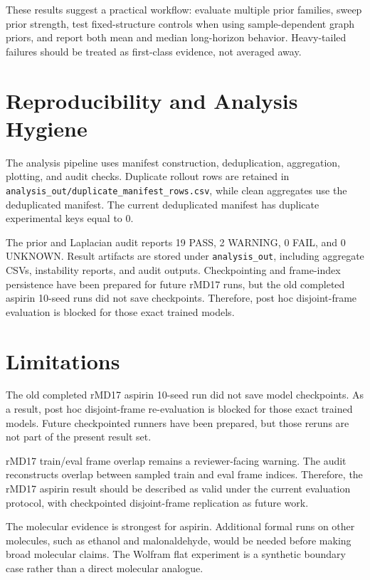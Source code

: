 \documentclass[pdflatex,sn-mathphys-num]{sn-jnl}
\begin{document}
These results suggest a practical workflow: evaluate multiple prior families, sweep prior strength, test fixed-structure controls when using sample-dependent graph priors, and report both mean and median long-horizon behavior. Heavy-tailed failures should be treated as first-class evidence, not averaged away.

\section{Reproducibility and Analysis Hygiene}

The analysis pipeline uses manifest construction, deduplication, aggregation, plotting, and audit checks. Duplicate rollout rows are retained in \texttt{analysis\_out/duplicate\_manifest\_rows.csv}, while clean aggregates use the deduplicated manifest. The current deduplicated manifest has duplicate experimental keys equal to 0.

The prior and Laplacian audit reports 19 PASS, 2 WARNING, 0 FAIL, and 0 UNKNOWN. Result artifacts are stored under \texttt{analysis\_out}, including aggregate CSVs, instability reports, and audit outputs. Checkpointing and frame-index persistence have been prepared for future rMD17 runs, but the old completed aspirin 10-seed runs did not save checkpoints. Therefore, post hoc disjoint-frame evaluation is blocked for those exact trained models.

\section{Limitations}

The old completed rMD17 aspirin 10-seed run did not save model checkpoints. As a result, post hoc disjoint-frame re-evaluation is blocked for those exact trained models. Future checkpointed runners have been prepared, but those reruns are not part of the present result set.

rMD17 train/eval frame overlap remains a reviewer-facing warning. The audit reconstructs overlap between sampled train and eval frame indices. Therefore, the rMD17 aspirin result should be described as valid under the current evaluation protocol, with checkpointed disjoint-frame replication as future work.

The molecular evidence is strongest for aspirin. Additional formal runs on other molecules, such as ethanol and malonaldehyde, would be needed before making broad molecular claims. The Wolfram flat experiment is a synthetic boundary case rather than a direct molecular analogue.
\end{document}
